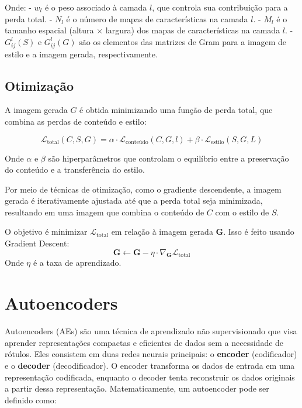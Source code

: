 \documentclass{article}
\begin{document}
Onde:
- $w_l$ é o peso associado à camada $l$, que controla sua contribuição para a perda total.
- $N_l$ é o número de mapas de características na camada $l$.
- $M_l$ é o tamanho espacial (altura $\times$ largura) dos mapas de características na camada $l$.
- $G^l_{ij}(S)$ e $G^l_{ij}(G)$ são os elementos das matrizes de Gram para a imagem de estilo e a imagem gerada, respectivamente.

\subsection{Otimização}

A imagem gerada $G$ é obtida minimizando uma função de perda total, que combina as perdas de conteúdo e estilo:

\begin{equation}
    \mathcal{L}_{\text{total}} (C, S, G) = \alpha \cdot \mathcal{L}_{\text{conteúdo}} (C, G, l) + \beta \cdot \mathcal{L}_{\text{estilo}} (S, G, L)
\end{equation}

Onde $\alpha$ e $\beta$ são hiperparâmetros que controlam o equilíbrio entre a preservação do conteúdo e a transferência do estilo.

Por meio de técnicas de otimização, como o gradiente descendente, a imagem gerada é iterativamente ajustada até que a perda total seja minimizada, resultando em uma imagem que combina o conteúdo de $C$ com o estilo de $S$.


O objetivo é minimizar \( \mathcal{L}_{\text{total}} \) em relação à imagem gerada \( \mathbf{G} \). Isso é feito usando Gradient Descent:
\[
\mathbf{G} \leftarrow \mathbf{G} - \eta \cdot \nabla_{\mathbf{G}} \mathcal{L}_{\text{total}}
\]
Onde \( \eta \) é a taxa de aprendizado.

\section{Autoencoders}

Autoencoders (AEs) são uma técnica de aprendizado não supervisionado que visa aprender representações compactas e eficientes de dados sem a necessidade de rótulos. Eles consistem em duas redes neurais principais: o \textbf{encoder} (codificador) e o \textbf{decoder} (decodificador). O encoder transforma os dados de entrada em uma representação codificada, enquanto o decoder tenta reconstruir os dados originais a partir dessa representação. Matematicamente, um autoencoder pode ser definido como:
\end{document}
